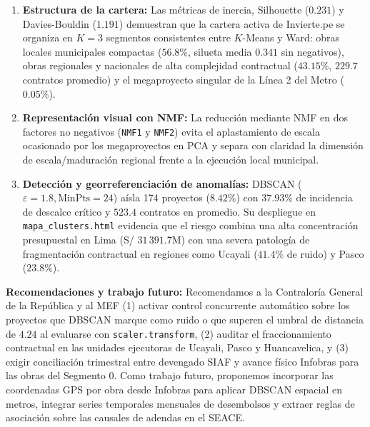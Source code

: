 \documentclass[conference]{IEEEtran}
\begin{document}
\begin{enumerate}
    \item \textbf{Estructura de la cartera:} Las m\'etricas de inercia, Silhouette ($0.231$) y Davies-Bouldin ($1.191$) demuestran que la cartera activa de Invierte.pe se organiza en $K = 3$ segmentos consistentes entre $K$-Means y Ward: obras locales municipales compactas ($56.8\%$, silueta media $0.341$ sin negativos), obras regionales y nacionales de alta complejidad contractual ($43.15\%$, $229.7$ contratos promedio) y el megaproyecto singular de la L\'inea 2 del Metro ($0.05\%$).
    \item \textbf{Representaci\'on visual con NMF:} La reducci\'on mediante NMF en dos factores no negativos (\texttt{NMF1} y \texttt{NMF2}) evita el aplastamiento de escala ocasionado por los megaproyectos en PCA y separa con claridad la dimensi\'on de escala/maduraci\'on regional frente a la ejecuci\'on local municipal.
    \item \textbf{Detecci\'on y georreferenciaci\'on de anomal\'ias:} DBSCAN ($\varepsilon = 1.8, \text{MinPts} = 24$) a\'isla 174 proyectos ($8.42\%$) con $37.93\%$ de incidencia de descalce cr\'itico y $523.4$ contratos en promedio. Su despliegue en \texttt{mapa\_clusters.html} evidencia que el riesgo combina una alta concentraci\'on presupuestal en Lima (S/ $31\,391.7$M) con una severa patolog\'ia de fragmentaci\'on contractual en regiones como Ucayali ($41.4\%$ de ruido) y Pasco ($23.8\%$).
\end{enumerate}

\textbf{Recomendaciones y trabajo futuro:} Recomendamos a la Contralor\'ia General de la Rep\'ublica y al MEF (1) activar control concurrente autom\'atico sobre los proyectos que DBSCAN marque como ruido o que superen el umbral de distancia de $4.24$ al evaluarse con \texttt{scaler.transform}, (2) auditar el fraccionamiento contractual en las unidades ejecutoras de Ucayali, Pasco y Huancavelica, y (3) exigir conciliaci\'on trimestral entre devengado SIAF y avance f\'isico Infobras para las obras del Segmento 0. Como trabajo futuro, proponemos incorporar las coordenadas GPS por obra desde Infobras para aplicar DBSCAN espacial en metros, integrar series temporales mensuales de desembolsos y extraer reglas de asociaci\'on sobre las causales de adendas en el SEACE.
\end{document}
